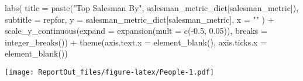 \documentclass[
]{article}
\newenvironment{Shaded}{\begin{snugshade}}{\end{snugshade}}
\newcommand{\AttributeTok}[1]{\textcolor[rgb]{0.77,0.63,0.00}{#1}}
\newcommand{\FloatTok}[1]{\textcolor[rgb]{0.00,0.00,0.81}{#1}}
\newcommand{\FunctionTok}[1]{\textcolor[rgb]{0.00,0.00,0.00}{#1}}
\newcommand{\NormalTok}[1]{#1}
\newcommand{\SpecialCharTok}[1]{\textcolor[rgb]{0.00,0.00,0.00}{#1}}
\newcommand{\StringTok}[1]{\textcolor[rgb]{0.31,0.60,0.02}{#1}}
\begin{document}
\begin{Shaded}
\begin{Highlighting}[]
  \FunctionTok{labs}\NormalTok{(}
    \AttributeTok{title =} \FunctionTok{paste}\NormalTok{(}\StringTok{"Top Salesman By"}\NormalTok{, salesman\_metric\_dict[salesman\_metric]),}
    \AttributeTok{subtitle =}\NormalTok{ repfor,}
    \AttributeTok{y =}\NormalTok{ salesman\_metric\_dict[salesman\_metric],}
    \AttributeTok{x =} \StringTok{""}
\NormalTok{  ) }\SpecialCharTok{+}
  \FunctionTok{scale\_y\_continuous}\NormalTok{(}\AttributeTok{expand =} \FunctionTok{expansion}\NormalTok{(}\AttributeTok{mult =} \FunctionTok{c}\NormalTok{(}\SpecialCharTok{{-}}\FloatTok{0.5}\NormalTok{, }\FloatTok{0.05}\NormalTok{)),}
                     \AttributeTok{breaks =} \FunctionTok{integer\_breaks}\NormalTok{()) }\SpecialCharTok{+}
  \FunctionTok{theme}\NormalTok{(}\AttributeTok{axis.text.x =} \FunctionTok{element\_blank}\NormalTok{(),}
        \AttributeTok{axis.ticks.x =} \FunctionTok{element\_blank}\NormalTok{())}
\end{Highlighting}
\end{Shaded}

\texttt{[image: ReportOut\_files/figure-latex/People-1.pdf]}
\end{document}
